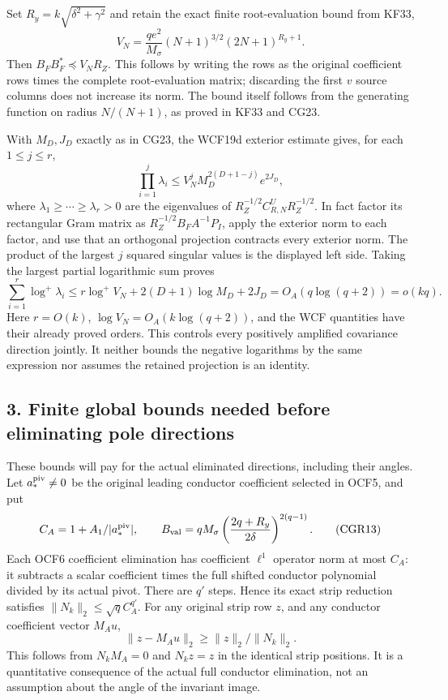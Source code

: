 \documentclass[11pt]{article}
\begin{document}
Set \(R_y=k\sqrt{\delta^2+\gamma^2}\) and retain the exact finite root-evaluation bound from KF33, \[
V_N=\frac{qe^2}{M_\sigma}(N+1)^{3/2}(2N+1)^{R_y+1}.
\tag{CGR10}
\] Then \(B_FB_F^*\preceq V_NR_Z\). This follows by writing the rows as the original coefficient rows times the complete root-evaluation matrix; discarding the first \(v\) source columns does not increase its norm. The bound itself follows from the generating function on radius \(N/(N+1)\), as proved in KF33 and CG23.

With \(M_D,J_D\) exactly as in CG23, the WCF19d exterior estimate gives, for each \(1\le j\le r\), \[
\prod_{i=1}^j\lambda_i
\le V_N^j M_D^{2(D+1-j)}e^{2J_D},
\tag{CGR11}
\] where \(\lambda_1\ge\cdots\ge\lambda_r>0\) are the eigenvalues of \(R_Z^{-1/2}C_{R,N}^UR_Z^{-1/2}\). In fact factor its rectangular Gram matrix as \(R_Z^{-1/2}B_FA^{-1}P_I\), apply the exterior norm to each factor, and use that an orthogonal projection contracts every exterior norm. The product of the largest \(j\) squared singular values is the displayed left side. Taking the largest partial logarithmic sum proves \[
\boxed{\sum_{i=1}^r\log^+\lambda_i
\le r\log^+V_N+2(D+1)\log M_D+2J_D
=O_A(q\log(q+2))=o(kq).}
\tag{CGR12}
\] Here \(r=O(k)\), \(\log V_N=O_A(k\log(q+2))\), and the WCF quantities have their already proved orders. This controls every positively amplified covariance direction jointly. It neither bounds the negative logarithms by the same expression nor assumes the retained projection is an identity.

\subsection{3. Finite global bounds needed before eliminating pole directions}\label{finite-global-bounds-needed-before-eliminating-pole-directions}

These bounds will pay for the actual eliminated directions, including their angles. Let \(a_*^{\rm piv}\ne0\) be the original leading conductor coefficient selected in OCF5, and put \[
C_A=1+A_1/|a_*^{\rm piv}|,\qquad
B_{\rm val}=qM_\sigma
\left(\frac{2q+R_y}{2\delta}\right)^{2(q-1)}.
\tag{CGR13}
\] Each OCF6 coefficient elimination has coefficient \(\ell^1\) operator norm at most \(C_A\): it subtracts a scalar coefficient times the full shifted conductor polynomial divided by its actual pivot. There are \(q'\) steps. Hence its exact strip reduction satisfies \(\|N_k\|_2\le\sqrt q C_A^{q'}\). For any original strip row \(z\), and any conductor coefficient vector \(M_Au\), \[
\|z-M_Au\|_2\ge\|z\|_2/\|N_k\|_2.
\tag{CGR14}
\] This follows from \(N_kM_A=0\) and \(N_kz=z\) in the identical strip positions. It is a quantitative consequence of the actual full conductor elimination, not an assumption about the angle of the invariant image.
\end{document}

